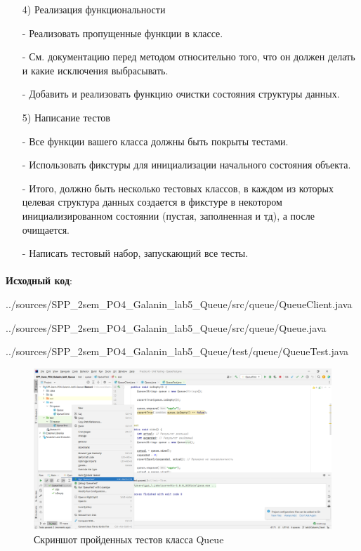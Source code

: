 \documentclass[12pt, a4paper, simple]{eskdtext}
\begin{document}
\begin{enumerate}
        \item[4)] Реализация функциональности
        \item[-] Реализовать пропущенные функции в классе.
        \item[-] См. документацию перед методом относительно того, что он должен делать и какие исключения выбрасывать. 
        \item[-] Добавить и реализовать функцию очистки состояния структуры данных.
        
        \item[5)] Написание тестов
        \item[-] Все функции вашего класса должны быть покрыты тестами.
        \item[-] Использовать фикстуры для инициализации начального состояния объекта.
        \item[-] Итого, должно быть несколько тестовых классов,
        в каждом из которых целевая структура данных создается в фикстуре в некотором инициализированном состоянии
        (пустая, заполненная и тд), а после очищается.
        \item[-] Написать тестовый набор, запускающий все тесты.
    \end{enumerate}

    \paragraph{} \textbf{Исходный код}: 

    
    {../sources/SPP_2sem_PO4_Galanin_lab5_Queue/src/queue/QueueClient.java}

    
    {../sources/SPP_2sem_PO4_Galanin_lab5_Queue/src/queue/Queue.java}

    
    {../sources/SPP_2sem_PO4_Galanin_lab5_Queue/test/queue/QueueTest.java}

    \begin{figure}[!h]
        \centering
        \includegraphics[width=16cm]
            {_assets/QueueTest.png}
        \caption{Скриншот пройденных тестов класса Queue}
    \end{figure}
\end{document}
